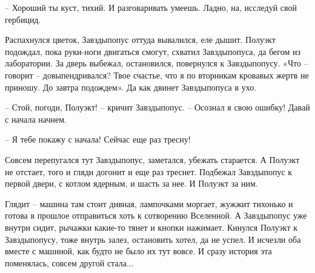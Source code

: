 \documentclass[ebook,oneside,final,openright]{memoir}
\begin{document}
– Хороший ты куст, тихий. И разговаривать умеешь. Ладно, на, исследуй свой гербицид.\par
\par
Распахнулся цветок, Завздыпопус оттуда вывалился, еле дышит. Полуэкт подождал, пока руки-ноги двигаться смогут, схватил Завздыпопуса, да бегом из лаборатории. За дверь выбежал, остановился, повернулся к Завздыпопусу. «Что – говорит – довыпендривался? Твое счастье, что я по вторникам кровавых жертв не приношу. До завтра подождем». Да как двинет Завздыпопуса в ухо.\par
\par
– Стой, погоди, Полуэкт! – кричит Завздыпопус. – Осознал я свою ошибку! Давай с начала начнем.\par
– Я тебе покажу с начала! Сейчас еще раз тресну!\par
\par
Совсем перепугался тут Завздыпопус, заметался, убежать старается. А Полуэкт не отстает, того и гляди догонит и еще раз треснет. Подбежал Завздыпопус к первой двери, с котлом ядерным, и шасть за нее. И Полуэкт за ним.\par
\par
Глядит – машина там стоит дивная, лампочками моргает, жужжит тихонько и готова в прошлое отправиться хоть к сотворению Вселенной. А Завздыпопус уже внутри сидит, рычажки какие-то тянет и кнопки нажимает. Кинулся Полуэкт к Завздыпопусу, тоже внутрь залез, остановить хотел, да не успел. И исчезли оба вместе с машиной, как будто не было их тут вовсе. И сразу история эта поменялась, совсем другой стала...\par
\end{document}

